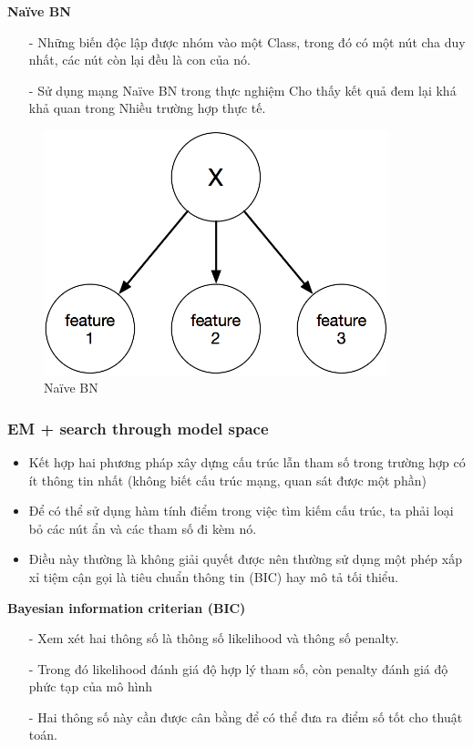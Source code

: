 \documentclass[12pt]{report}
\begin{document}
\textbf{Naïve BN}
\begin{itemize}
\item[-] Những biến độc lập được nhóm vào một 
Class, trong đó có một nút cha duy nhất, các 
nút còn lại đều là con của nó.
\item[-] Sử dụng mạng Naïve BN trong thực nghiệm 
Cho thấy kết quả đem lại khá khả quan trong
Nhiều trường hợp thực tế.
\end{itemize}

\begin{figure}[h]
\centering
\includegraphics[width=10cm]{naive-bayes.png}
\caption{Naïve BN}
\end{figure}

\subsubsection{EM + search through model space }
\begin{itemize}
\item Kết hợp hai phương pháp xây dựng cấu trúc lẫn tham số trong trường hợp có ít thông tin nhất (không biết cấu trúc mạng, quan sát được một phần)
\item Để có thể sử dụng hàm tính điểm trong việc tìm kiếm cấu trúc, ta phải loại bỏ các nút ẩn và các tham số đi kèm nó.
\item Điều này thường là không giải quyết được nên thường sử dụng một phép xấp xỉ tiệm cận gọi là tiêu chuẩn thông tin (BIC) hay mô tả tối thiểu.
\end{itemize}

\textbf{Bayesian information criterian (BIC)}
\begin{itemize}
\item[-] Xem xét hai thông số là thông số likelihood và thông số penalty.
\item[-] Trong đó likelihood đánh giá độ hợp lý tham số, còn penalty đánh giá độ phức tạp của mô hình
\item[-] Hai thông số này cần được cân bằng để có thể đưa ra điểm số tốt cho thuật toán.
\end{itemize}
\end{document}
